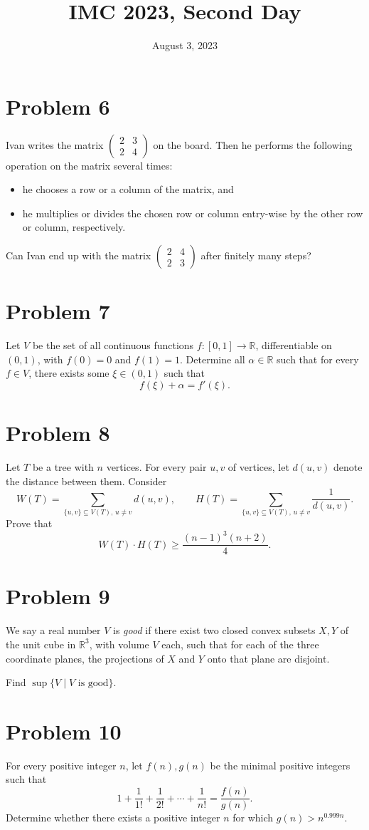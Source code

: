 \documentclass{article}
\title{IMC 2023, Second Day}
\date{August 3, 2023}
\begin{document}
\maketitle

\section*{Problem 6}
Ivan writes the matrix $\begin{pmatrix} 2 & 3 \\ 2 & 4 \end{pmatrix}$ on the board. Then he performs the following operation on the matrix several times:
\begin{itemize}
  \item he chooses a row or a column of the matrix, and
  \item he multiplies or divides the chosen row or column entry-wise by the other row or column, respectively.
\end{itemize}
Can Ivan end up with the matrix $\begin{pmatrix} 2 & 4 \\ 2 & 3 \end{pmatrix}$ after finitely many steps?

\section*{Problem 7}
Let $V$ be the set of all continuous functions $f : [0,1] \to \mathbb{R}$, differentiable on $(0,1)$, with $f(0) = 0$ and $f(1) = 1$. Determine all $\alpha \in \mathbb{R}$ such that for every $f \in V$, there exists some $\xi \in (0,1)$ such that
\[ f(\xi) + \alpha = f'(\xi). \]

\section*{Problem 8}
Let $T$ be a tree with $n$ vertices. For every pair $u, v$ of vertices, let $d(u,v)$ denote the distance between them. Consider
\[ W(T) = \sum_{\{u,v\} \subseteq V(T),\, u \neq v} d(u,v), \qquad H(T) = \sum_{\{u,v\} \subseteq V(T),\, u \neq v} \frac{1}{d(u,v)}. \]
Prove that
\[ W(T) \cdot H(T) \geq \frac{(n-1)^3 (n+2)}{4}. \]

\section*{Problem 9}
We say a real number $V$ is \emph{good} if there exist two closed convex subsets $X, Y$ of the unit cube in $\mathbb{R}^3$, with volume $V$ each, such that for each of the three coordinate planes, the projections of $X$ and $Y$ onto that plane are disjoint.

Find $\sup\{V \mid V \text{ is good}\}$.

\section*{Problem 10}
For every positive integer $n$, let $f(n), g(n)$ be the minimal positive integers such that
\[ 1 + \frac{1}{1!} + \frac{1}{2!} + \cdots + \frac{1}{n!} = \frac{f(n)}{g(n)}. \]
Determine whether there exists a positive integer $n$ for which $g(n) > n^{0.999 n}$.
\end{document}
